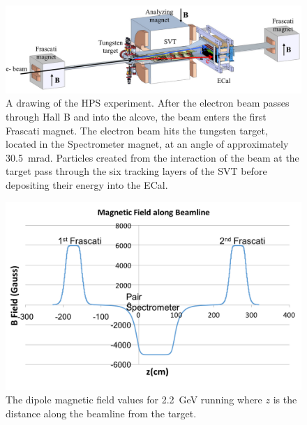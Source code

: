 \begin{figure}[htb]
  \centering
      \includegraphics[width=1.0\textwidth]{pics/experiment/hpsBeamline.png}
  \caption[HPS beamline]{A drawing of the HPS experiment. After the electron beam passes through Hall B and into the alcove, the beam enters the first Frascati magnet. The electron beam hits the tungsten target, located in the Spectrometer magnet, at an angle of approximately 30.5~mrad. Particles created from the interaction of the beam at the target pass through the six tracking layers of the SVT before depositing their energy into the ECal.}
  \label{Figure:hpsBeamline}
\end{figure}

\begin{figure}[htb]
  \centering
      \includegraphics[width=1.0\textwidth]{pics/experiment/bfield.png}
  \caption[HPS magnetic fields]{The dipole magnetic field values for 2.2~GeV running where $z$ is the distance along the beamline from the target.}
  \label{Figure:bField}
\end{figure}

